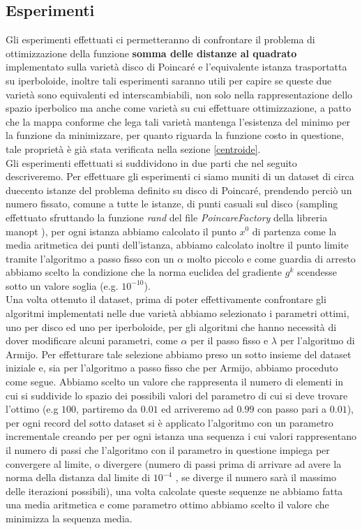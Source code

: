 \documentclass[a4paper, 12pt]{article}
\begin{document}
\subsection{Esperimenti}
Gli esperimenti effettuati ci permetteranno di confrontare il problema di ottimizzazione della funzione \textbf{somma delle distanze al quadrato} implementato sulla varietà disco di Poincaré e l'equivalente istanza trasportatta su iperboloide, inoltre tali esperimenti saranno utili per capire se queste due varietà sono equivalenti ed interscambiabili, non solo nella rappresentazione dello spazio iperbolico ma anche come varietà su cui effettuare ottimizzazione, a patto che la mappa conforme che lega tali varietà mantenga l'esistenza del minimo per la funzione da minimizzare, per quanto riguarda la funzione costo in questione, tale proprietà è già stata verificata nella sezione \ref{centroide}.\\
Gli esperimenti effettuati si suddividono in due parti che nel seguito descriveremo. Per effettuare gli esperimenti ci siamo muniti di un dataset di circa duecento istanze del problema definito su disco di Poincaré, prendendo perciò un numero fissato, comune a tutte le istanze, di punti casuali sul disco (sampling effettuato sfruttando la funzione \textit{rand} del file \textit{PoincareFactory} della libreria manopt \cite{ManOpt}), per ogni istanza abbiamo calcolato il punto $x^0$ di partenza come la media aritmetica dei punti dell'istanza, abbiamo calcolato inoltre il punto limite tramite l'algoritmo a passo fisso con un $\alpha$ molto piccolo e come guardia di arresto abbiamo scelto la condizione che la norma euclidea del gradiente $g^k$ scendesse sotto un valore soglia (e.g. $10^{-10}$).\\
Una volta ottenuto il dataset, prima di poter effettivamente confrontare gli algoritmi implementati nelle due varietà abbiamo selezionato i parametri ottimi, uno per disco ed uno per iperboloide, per gli algoritmi che hanno necessità di dover modificare alcuni parametri, come $\alpha$ per il passo fisso e $\lambda$ per l'algoritmo di Armijo. Per effetturare tale selezione abbiamo preso un sotto insieme del dataset iniziale e, sia per l'algoritmo a passo fisso che per Armijo, abbiamo proceduto come segue. Abbiamo scelto un valore che rappresenta il numero di elementi in cui si suddivide lo spazio dei possibili valori del parametro di cui si deve trovare  l'ottimo (e.g $100$, partiremo da $0.01$ ed arriveremo ad $0.99$ con passo pari a $0.01$), per ogni record del sotto dataset si è applicato l'algoritmo con un parametro incrementale creando per per ogni istanza una sequenza i cui valori rappresentano il numero di passi che l'algoritmo con il parametro in questione impiega per convergere al limite, o divergere (numero di passi prima di arrivare ad avere la norma della distanza dal limite di $10^{-4}$ , se diverge il numero sarà il massimo delle iterazioni possibili), una volta calcolate queste sequenze ne abbiamo fatta una media aritmetica e come parametro ottimo abbiamo scelto il valore che minimizza la sequenza media.\\
\end{document}
